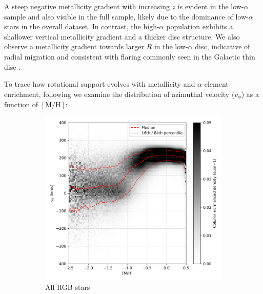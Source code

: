 \documentclass[a4paper,12pt]{article}
\begin{document}
A steep negative metallicity gradient with increasing $z$ is 
evident in the low-$\alpha$ sample and also visible in the full sample, likely due to the dominance of 
low-$\alpha$ stars in the overall dataset. In contrast, the high-$\alpha$ population exhibits a shallower 
vertical metallicity gradient and a thicker disc structure. We also observe a metallicity gradient towards 
larger $R$ in the low-$\alpha$ disc, indicative of radial migration and consistent with flaring commonly 
seen in the Galactic thin disc \citep[e.g.][]{Haywood2013,ratcliffe2023}.


To trace how rotational support evolves with metallicity and $\alpha$-element enrichment, following \citet{Vis2024} 
we examine the distribution of azimuthal velocity ($v_\phi$) as a function of $[\mathrm{M/H}]$:   

\begin{figure}[H]
  \centering
  \begin{subfigure}[b]{0.32\textwidth}
    \includegraphics[width=\textwidth]{../figures/vis_mh_vphi_all.png}
    \caption{All RGB stars}
  \end{subfigure}\hfill
  \begin{subfigure}[b]{0.32\textwidth}

\end{subfigure}
\end{figure}
\end{document}
